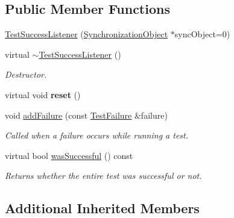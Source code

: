 \subsection*{Public Member Functions}
\begin{DoxyCompactItemize}
\item 
\hyperlink{class_test_success_listener_a88e82abf23a0563e345e0883d132f267}{Test\-Success\-Listener} (\hyperlink{class_synchronized_object_1_1_synchronization_object}{Synchronization\-Object} $\ast$sync\-Object=0)
\item 
\hypertarget{class_test_success_listener_a0d51db5b1bfc10a479563244d6dcd98c}{virtual \hyperlink{class_test_success_listener_a0d51db5b1bfc10a479563244d6dcd98c}{$\sim$\-Test\-Success\-Listener} ()}\label{class_test_success_listener_a0d51db5b1bfc10a479563244d6dcd98c}

\begin{DoxyCompactList}\small\item\em Destructor. \end{DoxyCompactList}\item 
\hypertarget{class_test_success_listener_aa6172d9c318a9a0fdb789b7668550290}{virtual void {\bfseries reset} ()}\label{class_test_success_listener_aa6172d9c318a9a0fdb789b7668550290}

\item 
void \hyperlink{class_test_success_listener_a912bb5ea408b2be5b39cfb45e1bb402f}{add\-Failure} (const \hyperlink{class_test_failure}{Test\-Failure} \&failure)
\begin{DoxyCompactList}\small\item\em Called when a failure occurs while running a test. \end{DoxyCompactList}\item 
\hypertarget{class_test_success_listener_aa33c3787a9251216c2ed4a865b4d4249}{virtual bool \hyperlink{class_test_success_listener_aa33c3787a9251216c2ed4a865b4d4249}{was\-Successful} () const }\label{class_test_success_listener_aa33c3787a9251216c2ed4a865b4d4249}

\begin{DoxyCompactList}\small\item\em Returns whether the entire test was successful or not. \end{DoxyCompactList}\end{DoxyCompactItemize}
\subsection*{Additional Inherited Members}


